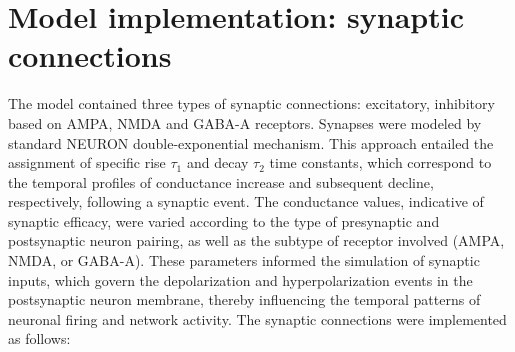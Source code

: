 \section{Model implementation: synaptic connections}
The model contained three types of synaptic connections: excitatory, inhibitory
based on AMPA, NMDA and GABA-A receptors. Synapses were modeled by standard
NEURON double-exponential mechanism. This approach entailed the assignment of
specific rise \(\tau_1\) and decay \(\tau_2\) time constants, which correspond
to the temporal profiles of conductance increase and subsequent decline,
respectively, following a synaptic event. The conductance values, indicative of
synaptic efficacy, were varied according to the type of presynaptic and
postsynaptic neuron pairing, as well as the subtype of receptor involved (AMPA,
NMDA, or GABA-A). These parameters informed the simulation of synaptic inputs,
which govern the depolarization and hyperpolarization events in the
postsynaptic neuron membrane, thereby influencing the temporal patterns of
neuronal firing and network activity. The synaptic connections were implemented
as follows:

